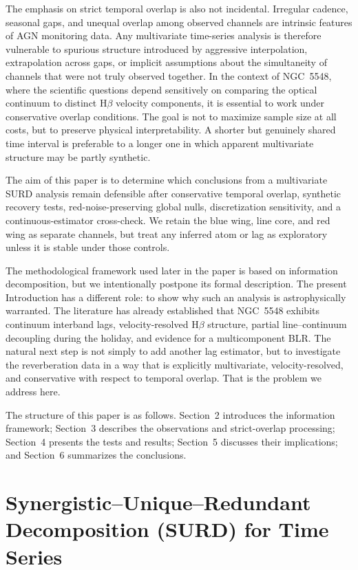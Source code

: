 \documentclass[fleqn,usenatbib]{mnras}
\begin{document}
The emphasis on strict temporal overlap is also not incidental. Irregular cadence, seasonal gaps, and unequal overlap among observed channels are intrinsic features of AGN monitoring data. Any multivariate time-series analysis is therefore vulnerable to spurious structure introduced by aggressive interpolation, extrapolation across gaps, or implicit assumptions about the simultaneity of channels that were not truly observed together. In the context of NGC~5548, where the scientific questions depend sensitively on comparing the optical continuum to distinct H$\beta$ velocity components, it is essential to work under conservative overlap conditions. The goal is not to maximize sample size at all costs, but to preserve physical interpretability. A shorter but genuinely shared time interval is preferable to a longer one in which apparent multivariate structure may be partly synthetic.

The aim of this paper is to determine which conclusions from a multivariate SURD analysis remain defensible after conservative temporal overlap, synthetic recovery tests, red-noise-preserving global nulls, discretization sensitivity, and a continuous-estimator cross-check. We retain the blue wing, line core, and red wing as separate channels, but treat any inferred atom or lag as exploratory unless it is stable under those controls.

The methodological framework used later in the paper is based on information decomposition, but we intentionally postpone its formal description. The present Introduction has a different role: to show why such an analysis is astrophysically warranted. The literature has already established that NGC~5548 exhibits continuum interband lags, velocity-resolved H$\beta$ structure, partial line--continuum decoupling during the holiday, and evidence for a multicomponent BLR. The natural next step is not simply to add another lag estimator, but to investigate the reverberation data in a way that is explicitly multivariate, velocity-resolved, and conservative with respect to temporal overlap. That is the problem we address here.

The structure of this paper is as follows. Section~2 introduces the information framework; Section~3 describes the observations and strict-overlap processing; Section~4 presents the tests and results; Section~5 discusses their implications; and Section~6 summarizes the conclusions.


\section{Synergistic--Unique--Redundant Decomposition (SURD) for Time Series}
\label{sec:surd_method}
\end{document}
